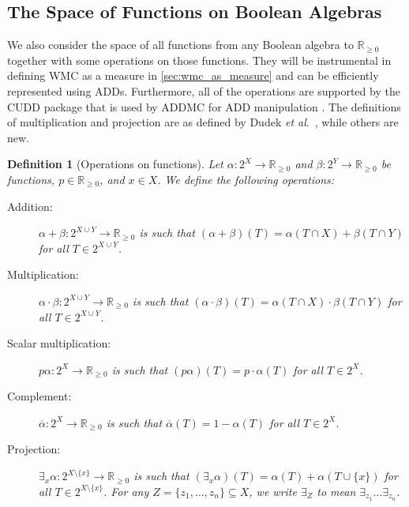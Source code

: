 \documentclass{article}
\newtheorem{definition}{Definition}
\newcommand{\etal}{\textit{et al}.}
\begin{document}
\subsection{The Space of Functions on Boolean Algebras}

We also consider the space of all functions from any Boolean algebra to
$\mathbb{R}_{\ge 0}$ together with some operations on those functions. They will
be instrumental in defining WMC as a measure in \cref{sec:wmc_as_measure} and
can be efficiently represented using ADDs. Furthermore, all of the operations
are supported by the CUDD \cite{somenzi1998cudd} package that is used by ADDMC
for ADD manipulation \cite{DBLP:conf/aaai/DudekPV20}. The definitions of
multiplication and projection are as defined by
Dudek \etal{}~, while others are new.

\begin{definition}[Operations on functions]
  Let $\alpha\colon 2^X \to \mathbb{R}_{\ge 0}$ and $\beta\colon 2^Y \to
  \mathbb{R}_{\ge 0}$ be functions, $p \in \mathbb{R}_{\ge 0}$, and $x \in X$.
  We define the following operations:
  \begin{description}
  \item[Addition:] $\alpha + \beta\colon 2^{X \cup Y} \to \mathbb{R}_{\ge 0}$ is
    such that $(\alpha + \beta)(T) = \alpha(T \cap X) + \beta(T \cap Y)$ for all
    $T \in 2^{X \cup Y}$.
  \item[Multiplication:] $\alpha \cdot \beta\colon 2^{X \cup Y} \to
    \mathbb{R}_{\ge 0}$ is such that $(\alpha \cdot \beta)(T) = \alpha(T \cap X)
    \cdot \beta(T \cap Y)$ for all $T \in 2^{X \cup Y}$.
  \item[Scalar multiplication:] $p\alpha\colon 2^X \to \mathbb{R}_{\ge 0}$ is
    such that $(p\alpha)(T) = p \cdot \alpha(T)$ for all $T \in 2^X$.
  \item[Complement:] $\overline{\alpha}\colon 2^X \to \mathbb{R}_{\ge 0}$ is
    such that $\overline{\alpha}(T) = 1 - \alpha(T)$ for all $T \in 2^X$.
  \item[Projection:] $\exists_x\alpha\colon 2^{X \setminus \{ x \}} \to
    \mathbb{R}_{\ge 0}$ is such that $(\exists_x\alpha)(T) = \alpha(T) +
    \alpha(T \cup \{ x \})$ for all $T \in 2^{X \setminus \{x \}}$. For any $Z =
    \{ z_1, \dots, z_n \} \subseteq X$, we write $\exists_Z$ to mean
    $\exists_{z_1}\dots\exists_{z_n}$.
  \end{description}
\end{definition}
\end{document}

